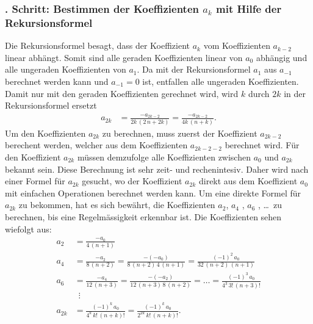 \subsubsection{. Schritt: Bestimmen der Koeffizienten $a_k$ mit Hilfe der Rekursionsformel }
Die Rekursionsformel  besagt,
dass der Koeffizient $a_k$ vom Koeffizienten $a_{k-2}$ linear abh\"angt.
Somit sind alle geraden Koeffizienten linear von $a_0$ abh\"angig und alle un\-geraden Koeffizienten von $a_1$.
Da mit der Rekursionsformel  $a_1$ aus $a_{-1}$ berechnet werden kann und $a_{-1} = 0$ ist,
entfallen alle ungeraden Koeffizienten.
Damit nur mit den geraden Koeffizienten gerechnet wird,
wird $k$ durch $2k$ in der Rekursionsformel  ersetzt
\begin{align}
	\nonumber
	a_{2k}
	&=
	\frac
	{
		-a_{2k - 2}
	}{
		2k \, \left( 2 \, n + 2k \right)	
	}
	=
	\frac
	{
		-a_{2k - 2}
	}{
		4k \, \left( n + k \right)	
	}
	\text{.}
\end{align}
Um den Koeffizienten $a_{2k}$ zu berechnen,
muss zuerst der Koeffizient $a_{2k-2}$ berechent werden,
welcher aus dem Koeffizienten $a_{2k-2-2}$ berechnet wird.
F\"ur den Koeffizient $a_{2k}$ m\"ussen demzufolge alle Koeffizienten zwischen $a_0$ und $a_{2k}$ bekannt sein.
Diese Berechnung ist sehr zeit- und rechenintesiv.
Daher wird nach einer Formel f\"ur $a_{2k}$ gesucht,
wo der Koeffizient $a_{2k}$ direkt aus dem Koeffizient $a_0$ mit einfachen Operationen berechnet werden kann.
Um eine direkte Formel f\"ur $a_{2k}$ zu bekommen,
hat es sich bew\"ahrt,
die Koeffizienten $a_2$, $a_4$ , $a_6$ , \dots \, zu berechnen,
bis eine Regelm\"assigkeit erkennbar ist.
Die Koeffizienten sehen wiefolgt aus:
\begin{align}
	\nonumber
	a_2
	&=
	\frac
	{
		-a_0
	}{
		4 \, \left( n + 1 \right)	
	}
	\\
	\nonumber
	a_4
	&=
	\frac
	{
		-a_{2}
	}{
		8 \, \left( n + 2 \right)	
	}
	=
	\frac
	{
		- \left( - a_{0} \right)
	}{
		8 \, \left( n + 2 \right) \, 4 \, \left( n + 1 \right)
	}
	=
	\frac
	{
		\left( -1 \right) ^2 \, a_{0}
	}{
		32 \, \left( n + 2 \right) \, \left( n + 1 \right)
	}
	\\
	\nonumber
	a_6
	&=
	\frac
	{
		-a_{4}
	}{
		12 \, \left( n + 3 \right)	
	}
	=
	\frac
	{
		- \left( - a_{2} \right)
	}{
		12 \, \left( n + 3 \right) \, 8 \, \left( n + 2 \right)
	}
	=
	\dots
	=
	\frac
	{
		\left( -1 \right) ^3 \, a_{0}
	}{
		4^3 \, {3}! \, {\left( n + 3 \right)}!
	}
	\\
	\nonumber
	& \, \, \, \vdots
	\\
	a_{2k}
	&=	
	\frac
	{
		\left( -1 \right) ^k \, a_0 
	}{
		4^k \, {k}! \, {\left( n + k \right)}!
	}
	=
	\frac
	{
		\left( -1 \right) ^k \, a_0
	}{
		2^{2k} \, {k}! \, {\left( n + k \right)}!
	}
	\label{eq:bessel:koeffizienten:gerade}
	\text{.}
\end{align}
